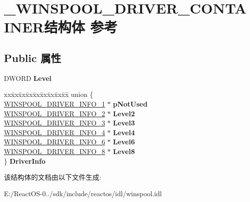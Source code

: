 \hypertarget{struct___w_i_n_s_p_o_o_l___d_r_i_v_e_r___c_o_n_t_a_i_n_e_r}{}\section{\+\_\+\+W\+I\+N\+S\+P\+O\+O\+L\+\_\+\+D\+R\+I\+V\+E\+R\+\_\+\+C\+O\+N\+T\+A\+I\+N\+E\+R结构体 参考}
\label{struct___w_i_n_s_p_o_o_l___d_r_i_v_e_r___c_o_n_t_a_i_n_e_r}
\subsection*{Public 属性}
\begin{DoxyCompactItemize}
\item 
\mbox{\label{struct___w_i_n_s_p_o_o_l___d_r_i_v_e_r___c_o_n_t_a_i_n_e_r_af5fd03aae4136463a8f37f2d6284a67a}} 
D\+W\+O\+RD {\bfseries Level}
\item 
\mbox{\label{struct___w_i_n_s_p_o_o_l___d_r_i_v_e_r___c_o_n_t_a_i_n_e_r_a94f0b9face49d2b1a2ef10c26e7f978b}} 
\begin{tabbing}
xx\=xx\=xx\=xx\=xx\=xx\=xx\=xx\=xx\=\kill
union \{\\
\>\hyperlink{struct___w_i_n_s_p_o_o_l___d_r_i_v_e_r___i_n_f_o__1}{WINSPOOL\_DRIVER\_INFO\_1} $\ast$ {\bfseries pNotUsed}\\
\>\hyperlink{struct___w_i_n_s_p_o_o_l___d_r_i_v_e_r___i_n_f_o__2}{WINSPOOL\_DRIVER\_INFO\_2} $\ast$ {\bfseries Level2}\\
\>\hyperlink{struct___w_i_n_s_p_o_o_l___d_r_i_v_e_r___i_n_f_o__3}{WINSPOOL\_DRIVER\_INFO\_3} $\ast$ {\bfseries Level3}\\
\>\hyperlink{struct___w_i_n_s_p_o_o_l___d_r_i_v_e_r___i_n_f_o__4}{WINSPOOL\_DRIVER\_INFO\_4} $\ast$ {\bfseries Level4}\\
\>\hyperlink{struct___w_i_n_s_p_o_o_l___d_r_i_v_e_r___i_n_f_o__6}{WINSPOOL\_DRIVER\_INFO\_6} $\ast$ {\bfseries Level6}\\
\>\hyperlink{struct___w_i_n_s_p_o_o_l___d_r_i_v_e_r___i_n_f_o__8}{WINSPOOL\_DRIVER\_INFO\_8} $\ast$ {\bfseries Level8}\\
\} {\bfseries DriverInfo}\\

\end{tabbing}\end{DoxyCompactItemize}


该结构体的文档由以下文件生成\+:\begin{DoxyCompactItemize}
\item 
E\+:/\+React\+O\+S-\/0../sdk/include/reactos/idl/winspool.\+idl\end{DoxyCompactItemize}
